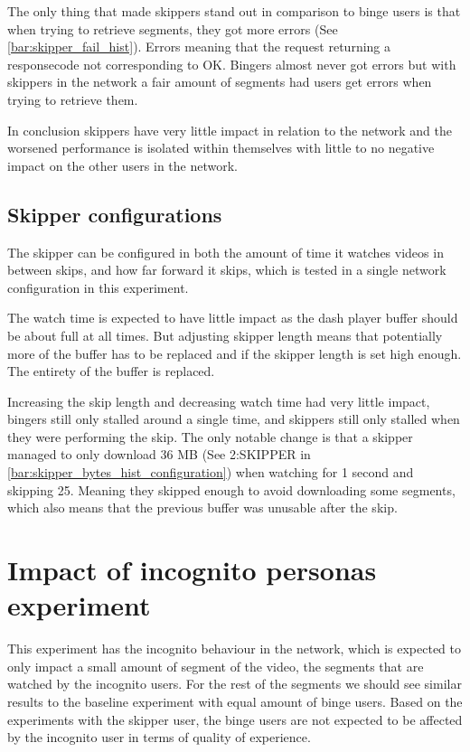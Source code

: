 The only thing that made skippers stand out in comparison to binge users is that when trying to retrieve segments, they got more errors (See \autoref{bar:skipper_fail_hist}). Errors meaning that the request returning a responsecode not corresponding to OK. Bingers almost never got errors but with skippers in the network a fair amount of segments had users get errors when trying to retrieve them. %

In conclusion skippers have very little impact in relation to the network and the worsened performance is isolated within themselves with little to no negative impact on the other users in the network.

\subsection{Skipper configurations}
The skipper can be configured in both the amount of time it watches videos in between skips, and how far forward it skips, which is tested in a single network configuration in this experiment.

The watch time is expected to have little impact as the dash player buffer should be about full at all times. But adjusting skipper length means that potentially more of the buffer has to be replaced and if the skipper length is set high enough. The entirety of the buffer is replaced. %

Increasing the skip length and decreasing watch time had very little impact, bingers still only stalled around a single time, and skippers still only stalled when they were performing the skip. The only notable change is that a skipper managed to only download 36 \ac{MB} (See 2:SKIPPER in \autoref{bar:skipper_bytes_hist_configuration}) when watching for 1 second and skipping 25. Meaning they skipped enough to avoid downloading some segments, which also means that the previous buffer was unusable after the skip. 
 
 
\section{Impact of incognito personas experiment}
This experiment has the incognito behaviour in the network, which is expected to only impact a small amount of segment of the video, the segments that are watched by the incognito users. For the rest of the segments we should see similar results to the baseline experiment with equal amount of binge users. Based on the experiments with the skipper user, the binge users are not expected to be affected by the incognito user in terms of quality of experience.

